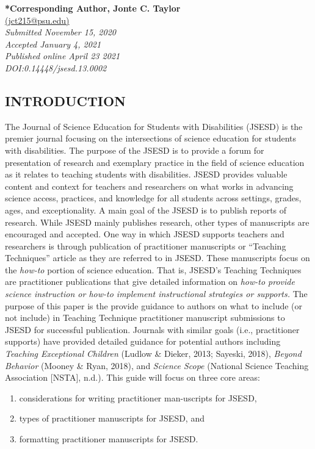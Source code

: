 \documentclass[11.5pt]{sig-alternate} %
\begin{document}
\textbf{*Corresponding Author, Jonte C. Taylor }\\
\href{mailto: jct215@psu.edu }{(jct215@psu.edu)} \\
\textit{Submitted November 15, 2020 }\\
\textit{Accepted January 4, 2021} \\
\textit{Published online  April 23 2021} \\
\textit{DOI:0.14448/jsesd.13.0002} \\
\pagebreak
\clearpage
\begin{large}

\section*{INTRODUCTION}
The Journal of Science Education for Students with Disabilities (JSESD) is the premier journal focusing on the intersections of science education for students with disabilities. The purpose of the JSESD is to provide a forum for presentation of research and exemplary practice in the field of science education as it relates to teaching students with disabilities.  JSESD provides valuable content and context for teachers and researchers on what works in advancing science access, practices, and knowledge for all students across settings, grades, ages, and exceptionality.  A main goal of the JSESD is to publish reports of research. While JSESD mainly publishes research, other types of manuscripts are encouraged and accepted.  One way in which JSESD supports teachers and researchers is through publication of practitioner manuscripts or “Teaching Techniques” article as they are referred to in JSESD.  These manuscripts focus on the \textit{how-to} portion of science education.  That is, JSESD’s Teaching Techniques are practitioner publications that give detailed information on \textit{how-to provide science instruction or how-to implement instructional strategies or supports.}  The purpose of this paper is the provide guidance to authors on what to include (or not include) in Teaching Technique practitioner manuscript submissions to JSESD for successful publication.  Journals with similar goals (i.e., practitioner supports) have provided detailed guidance for potential authors including \textit{Teaching Exceptional Children} (Ludlow \& Dieker, 2013; Sayeski, 2018), \textit{Beyond Behavior} (Mooney \& Ryan, 2018), and \textit{Science Scope} (National Science Teaching Association [NSTA], n.d.). This guide will focus on three core areas:
\begin{enumerate}
\item considerations for writing practitioner man-uscripts for JSESD,
\item 	types of practitioner manuscripts for JSESD, and
\item 	formatting practitioner manuscripts for JSESD.
\end{enumerate}


\end{large}
\end{document}

